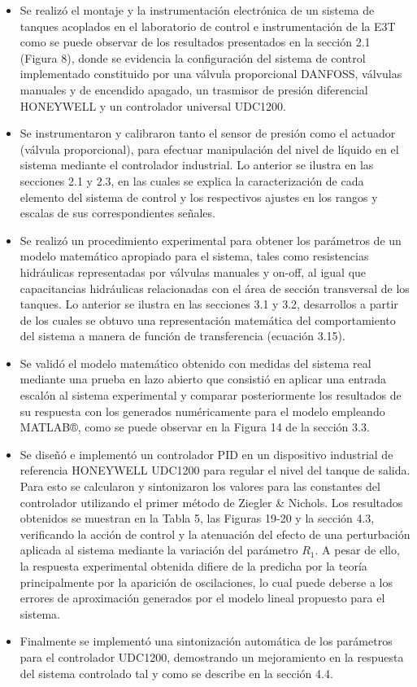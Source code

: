 \documentclass[a4paper,12pt,twoside]{proyectotanquesecci}
\begin{document}
\begin{itemize}
\item Se realizó el montaje y la instrumentación electrónica de un sistema de tanques acoplados en el laboratorio de control e instrumentación de la E3T como se puede observar de los resultados presentados en la sección 2.1 (Figura 8), donde se evidencia la configuración del sistema de control implementado constituido por una válvula proporcional DANFOSS, válvulas manuales y de encendido apagado, un trasmisor de presión diferencial HONEYWELL y un controlador universal UDC1200.
\item Se instrumentaron y calibraron tanto el sensor de presión como el actuador (válvula proporcional), para efectuar manipulación del nivel de líquido en el sistema mediante el controlador industrial. Lo anterior se ilustra en las secciones 2.1 y 2.3, en las cuales se explica la caracterización de cada elemento del sistema de control y los respectivos ajustes en los rangos y escalas de sus correspondientes señales.
\item Se realizó un procedimiento experimental para obtener los parámetros de un modelo matemático apropiado para el sistema, tales como resistencias hidráulicas representadas por válvulas manuales y on-off, al igual que capacitancias hidráulicas relacionadas con el área de sección transversal de los tanques. Lo anterior se ilustra en las secciones 3.1 y 3.2, desarrollos a partir de los cuales se obtuvo una representación matemática del comportamiento del sistema a manera de función de transferencia (ecuación 3.15).
\item Se validó el modelo matemático obtenido con medidas del sistema real mediante una prueba en lazo abierto que consistió en aplicar una entrada escalón al sistema experimental y comparar posteriormente los resultados de su respuesta con los generados numéricamente para el modelo empleando MATLAB®, como se puede observar en la Figura 14 de la sección 3.3.
\item Se diseñó e implementó un controlador PID en un dispositivo industrial de referencia HONEYWELL UDC1200 para regular el nivel del tanque de salida. Para esto se calcularon y sintonizaron los valores para las constantes del controlador utilizando el primer método de Ziegler & Nichols. Los resultados obtenidos se muestran en la Tabla 5, las Figuras 19-20 y la sección 4.3, verificando la acción de control y la atenuación del efecto de una perturbación aplicada al sistema mediante la variación del parámetro $R_{1}$. A pesar de ello, la respuesta experimental obtenida difiere de la predicha por la teoría principalmente por la aparición de oscilaciones, lo cual puede deberse a los errores de aproximación generados por el modelo lineal propuesto para el sistema.
\item Finalmente se implementó una sintonización automática de los parámetros para el controlador UDC1200, demostrando un mejoramiento en la respuesta del sistema controlado tal y como se describe en la sección 4.4.
\end{itemize}
\end{document}
